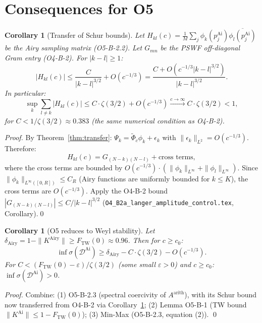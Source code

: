 \documentclass[12pt,a4paper]{amsart}
\newtheorem{corollary}[theorem]{Corollary}
\theoremstyle{definition}
\newcommand{\KAi}{K^{\mathrm{Airy}}}
\newcommand{\norm}[1]{\|#1\|}
\newcommand{\abs}[1]{\left|#1\right|}
\begin{document}
\section{Consequences for O5}
\label{sec:consequences}

\begin{corollary}[Transfer of Schur bounds]\label{cor:schur_transfer}
Let $H_{kl}(c) = \frac{1}{M}\sum_j \phi_k(p_j^{\mathrm{Ai}})\overline{\phi_l(p_j^{\mathrm{Ai}})}$
be the Airy sampling matrix (O5-B-2.2).
Let $G_{mn}$ be the PSWF off-diagonal Gram entry (O4-B-2).
For $|k-l| \ge 1$:
\begin{equation}\label{eq:transfer_schur}
  \abs{H_{kl}(c)}
  \le \frac{C}{|k-l|^{3/2}} + O(c^{-1/3})
  = \frac{C + O(c^{-1/3}|k-l|^{3/2})}{|k-l|^{3/2}}.
\end{equation}
In particular:
\[
  \sup_k \sum_{l \ne k} \abs{H_{kl}(c)}
  \le C \cdot \zeta(3/2) + O(c^{-1/3})
  \xrightarrow{c\to\infty} C\cdot\zeta(3/2) < 1,
\]
for $C < 1/\zeta(3/2) \approx 0.383$ (the same numerical condition as O4-B-2).
\end{corollary}

\begin{proof}
By Theorem~\ref{thm:transfer}:
$\Psi_k = \tilde{\Phi}_c\phi_k + \epsilon_k$ with $\norm{\epsilon_k}_{L^2} = O(c^{-1/3})$.
Therefore:
\[
  H_{kl}(c) = G_{(N-k)(N-l)} + \text{cross terms},
\]
where the cross terms are bounded by
$O(c^{-1/3})\cdot(\norm{\phi_k}_{L^\infty}+\norm{\phi_l}_{L^\infty})$.
Since $\norm{\phi_k}_{L^\infty([0,R])} \le C_R$ (Airy functions are uniformly bounded
for $k \le K$), the cross terms are $O(c^{-1/3})$.
Apply the O4-B-2 bound $|G_{(N-k)(N-l)}| \le C/|k-l|^{3/2}$
(\texttt{O4\_B2a\_langer\_amplitude\_control.tex}, Corollary).\qed
\end{proof}

\begin{corollary}[O5 reduces to Weyl stability]\label{cor:weyl}
Let $\delta_{\mathrm{Airy}} = 1 - \norm{\KAi} \ge F_{\mathrm{TW}}(0) \approx 0.96$.
Then for $c \ge c_0$:
\[
  \inf\sigma(\mathcal{D}^{\mathrm{Ai}})
  \ge \delta_{\mathrm{Airy}} - C\cdot\zeta(3/2) - O(c^{-1/3}).
\]
For $C < (F_{\mathrm{TW}}(0) - \varepsilon)/\zeta(3/2)$ (some small $\varepsilon > 0$)
and $c \ge c_0$:
$\inf\sigma(\mathcal{D}^{\mathrm{Ai}}) > 0$.
\end{corollary}

\begin{proof}
Combine:
(1) O5-B-2.3 (spectral coercivity of $A^{\mathrm{arith}}$),
with its Schur bound now transferred from O4-B-2 via Corollary~\ref{cor:schur_transfer};
(2) Lemma O5-B-1 (TW bound $\norm{K^{\mathrm{Ai}}} \le 1 - F_{\mathrm{TW}}(0)$);
(3) Min-Max (O5-B-2.3, equation (2)).
\qed
\end{proof}
\end{document}
